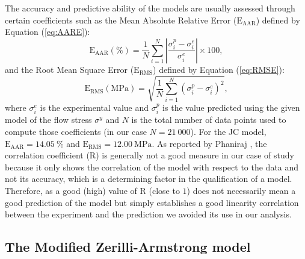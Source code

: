 \documentclass[twoside,english,1p,final,sort&compress]{elsarticle}
\theoremstyle{plain}
\DeclareRobustCommand{\RMSE}{\text{E}_\text{RMS}}
\DeclareRobustCommand{\AARE}{\text{E}_\text{AAR}}
\DeclareRobustCommand{\R}{\text{R}}
\DeclareRobustCommand{\MPa}{\text{MPa}}
\begin{document}
The accuracy and predictive ability of the models are usually assessed through certain coefficients such as the Mean Absolute Relative Error ($\AARE$) defined by Equation (\ref{eq:AARE}):
\begin{equation}
\AARE(\%) = \frac{1}{N} \sum_{i=1}^{N}{\left|\frac{\sigma_i^p -\sigma_i^e}{\sigma_i^e}\right|} \times 100, \label{eq:AARE}
\end{equation}
and the Root Mean Square Error ($\RMSE$) defined by Equation (\ref{eq:RMSE}):
\begin{equation}
\RMSE (\MPa) = \sqrt{\frac{1}{N} \sum_{i=1}^{N} \left(\sigma_i^p - \sigma_i^e\right)^2}, \label{eq:RMSE}
\end{equation}
where $\sigma_i^e$ is the experimental value and $\sigma_i^p$ is the value predicted using the given model of the flow stress $\sigma^y$ and $N$ is the total number of data points used to compute those coefficients (in our case $N=21~000$).
For the JC model, $\AARE=14.05~\%$ and $\RMSE=12.00~\MPa$.
As reported by Phaniraj \cite{Phaniraj-2003}, the correlation coefficient ($\R$) is generally not a good measure in our case of study because it only shows the correlation of the model with respect to the data and not its accuracy, which is a determining factor in the qualification of a model.
Therefore, as a good (high) value of $\R$ (close to $1$) does not necessarily mean a good prediction of the model but simply establishes a good linearity correlation between the experiment and the prediction we avoided its use in our analysis.

\subsection{The Modified Zerilli-Armstrong model\label{sec:MZA}}
\end{document}
